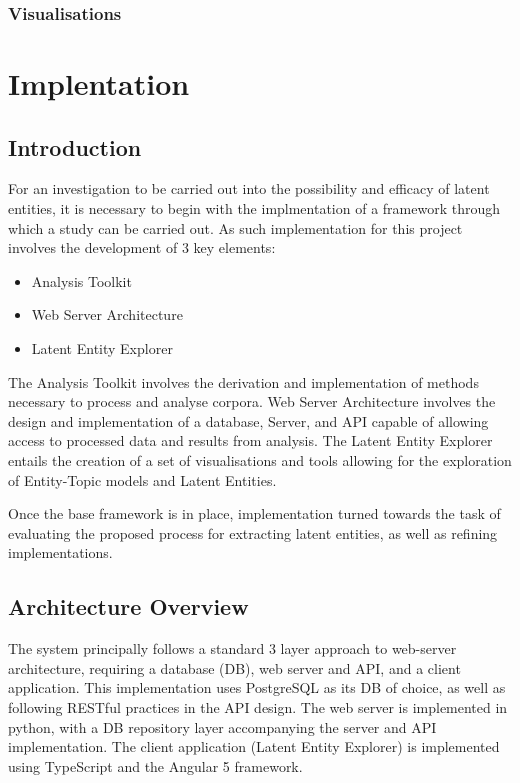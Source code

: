 \documentclass[10pt]{report}
\begin{document}
\subsection{Visualisations}

%
%
%
%
%
\chapter{Implentation}
\section{Introduction}
For an investigation to be carried out into the possibility and efficacy of latent entities, it is necessary to begin with the implmentation of a framework through which a study can be carried out. As such implementation for this project involves the development of 3 key elements:

\renewcommand{\baselinestretch}{0.5}\normalsize
\begin{itemize}
\item Analysis Toolkit
\item Web Server Architecture
\item Latent Entity Explorer
\end{itemize}
\renewcommand{\baselinestretch}{2.0}\normalsize
The Analysis Toolkit involves the derivation and implementation of methods necessary to process and analyse corpora. Web Server Architecture involves the design and implementation of a database, Server, and API capable of allowing access to processed data and results from analysis. The Latent Entity Explorer entails the creation of a set of visualisations and tools allowing for the exploration of Entity-Topic models and Latent Entities.

Once the base framework is in place, implementation turned towards the task of evaluating the proposed process for extracting latent entities, as well as refining implementations.

\section{Architecture Overview}
The system principally follows a standard 3 layer approach to web-server architecture, requiring a database (DB), web server and API, and a client application. This implementation uses PostgreSQL as its DB of choice, as well as following RESTful practices in the API design. The web server is implemented in python, with a DB repository layer accompanying the server and API implementation. The client application (Latent Entity Explorer) is implemented using TypeScript and the Angular 5 framework.
\end{document}
